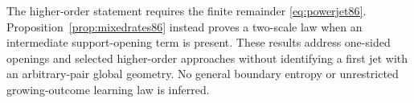 The higher-order statement requires the finite remainder
\eqref{eq:powerjet86}.  Proposition~\ref{prop:mixedrates86} instead
proves a two-scale law when an intermediate support-opening term is
present.  These results address one-sided openings and selected
higher-order approaches without identifying a first jet with an
arbitrary-pair global geometry.  No general boundary entropy or
unrestricted growing-outcome learning law is inferred.
